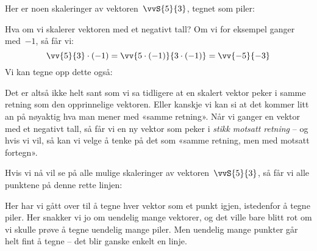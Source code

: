 Her er noen skaleringer av vektoren~$\vvS{5}{3}$, tegnet som piler:
\begin{center}
\end{center}

Hva om vi skalerer vektoren med et negativt tall?  Om vi for eksempel
ganger med~$-1$, så får vi:
\[
\vv{5}{3} \cdot (-1) = \vv{5 \cdot (-1)}{3 \cdot (-1)} = \vv{-5}{-3}
\]
Vi kan tegne opp dette også:
\begin{center}
\end{center}
Det er altså ikke helt sant som vi sa tidligere at en skalert vektor
peker i samme retning som den opprinnelige vektoren.  Eller kanskje vi
kan si at det kommer litt an på nøyaktig hva man mener med «samme
retning».  Når vi ganger en vektor med et negativt tall, så får vi en
ny vektor som peker i \emph{stikk motsatt retning} -- og hvis vi vil,
så kan vi velge å tenke på det som «samme retning, men med motsatt
fortegn».

Hvis vi nå vil se på alle mulige skaleringer av vektoren~$\vvS{5}{3}$,
så får vi alle punktene på denne rette linjen:
\begin{center}
\end{center}
Her har vi gått over til å tegne hver vektor som et punkt igjen,
istedenfor å tegne piler.  Her snakker vi jo om uendelig mange
vektorer, og det ville bare blitt rot om vi skulle prøve å tegne
uendelig mange piler.  Men uendelig mange punkter går helt fint å
tegne -- det blir ganske enkelt en linje.

